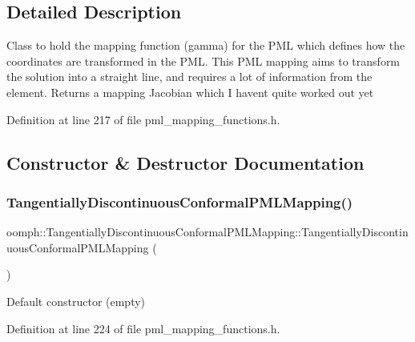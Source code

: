 \subsection{Detailed Description}
Class to hold the mapping function (gamma) for the P\+ML which defines how the coordinates are transformed in the P\+ML. This P\+ML mapping aims to transform the solution into a straight line, and requires a lot of information from the element. Returns a mapping Jacobian which I haven\textquotesingle{}t quite worked out yet 

Definition at line 217 of file pml\+\_\+mapping\+\_\+functions.\+h.



\subsection{Constructor \& Destructor Documentation}
\mbox{\label{classoomph_1_1TangentiallyDiscontinuousConformalPMLMapping_a4c7160c00452fbc7b8d327e51cf53f0a}} 
\subsubsection{\texorpdfstring{Tangentially\+Discontinuous\+Conformal\+P\+M\+L\+Mapping()}{TangentiallyDiscontinuousConformalPMLMapping()}}
{\footnotesize\ttfamily oomph\+::\+Tangentially\+Discontinuous\+Conformal\+P\+M\+L\+Mapping\+::\+Tangentially\+Discontinuous\+Conformal\+P\+M\+L\+Mapping (\begin{DoxyParamCaption}{ }\end{DoxyParamCaption})\hspace{0.3cm}{\ttfamily [inline]}}



Default constructor (empty) 



Definition at line 224 of file pml\+\_\+mapping\+\_\+functions.\+h.



